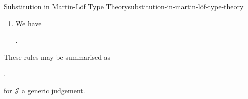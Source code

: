 \begin{definition}{Substitution in Martin-Löf Type Theory}{substitution-in-martin-löf-type-theory}
\begin{enumerate}
            \begin{webprooftree}%
                \begin{prooftree}%
                \end{prooftree}%
                .%
            \end{webprooftree}%
        \item\label{substitution-in-martin-löf-type-theory-substitution-in-judgemental-equality-of-terms}We have
            \begin{webprooftree}%
                \begin{prooftree}%
                \end{prooftree}%
                .%
            \end{webprooftree}%
    \end{enumerate}
    These rules may be summarised as
    \begin{webprooftree}%
        \begin{prooftree}%
        \end{prooftree}%
        .%
    \end{webprooftree}%
    for $\mathcal{J}$ a generic judgement.
\end{definition}
